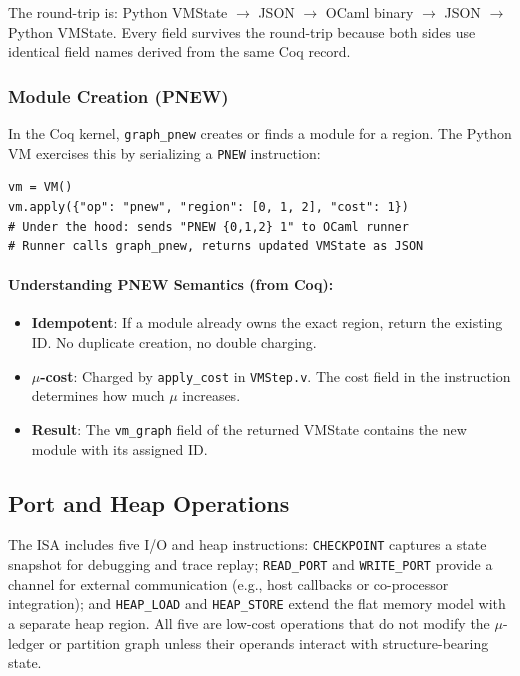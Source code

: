 The round-trip is: Python VMState $\to$ JSON $\to$ OCaml binary $\to$ JSON $\to$ Python VMState. Every field survives the round-trip because both sides use identical field names derived from the same Coq record.

\subsubsection{Module Creation (PNEW)}

In the Coq kernel, \texttt{graph\_pnew} creates or finds a module for a region. The Python VM exercises this by serializing a \texttt{PNEW} instruction:
\begin{lstlisting}
vm = VM()
vm.apply({"op": "pnew", "region": [0, 1, 2], "cost": 1})
# Under the hood: sends "PNEW {0,1,2} 1" to OCaml runner
# Runner calls graph_pnew, returns updated VMState as JSON
\end{lstlisting}

\paragraph{Understanding PNEW Semantics (from Coq):}
\begin{itemize}
    \item \textbf{Idempotent}: If a module already owns the exact region, return the existing ID. No duplicate creation, no double charging.
    \item \textbf{$\mu$-cost}: Charged by \texttt{apply\_cost} in \texttt{VMStep.v}. The cost field in the instruction determines how much $\mu$ increases.
    \item \textbf{Result}: The \texttt{vm\_graph} field of the returned VMState contains the new module with its assigned ID.
\end{itemize}

\subsection{Port and Heap Operations}

The ISA includes five I/O and heap instructions: \texttt{CHECKPOINT} captures a state snapshot for debugging and trace replay; \texttt{READ\_PORT} and \texttt{WRITE\_PORT} provide a channel for external communication (e.g., host callbacks or co-processor integration); and \texttt{HEAP\_LOAD} and \texttt{HEAP\_STORE} extend the flat memory model with a separate heap region. All five are low-cost operations that do not modify the $\mu$-ledger or partition graph unless their operands interact with structure-bearing state.

